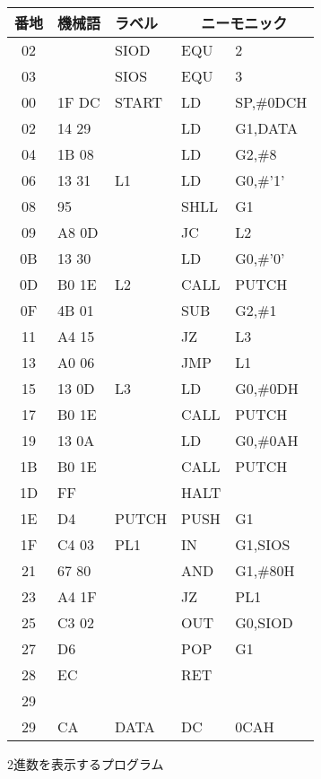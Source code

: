 \begin{figure}
{\small\tt\begin{center}
\begin{tabular}{|c|l|l|l l |} \hline
番地 & 機械語 & ラベル & \multicolumn{2}{|c|}{ニーモニック} \\
\hline
02 &       & SIOD   & EQU    & 2                 \\
03 &       & SIOS   & EQU    & 3                 \\
00 & 1F DC & START  & LD     & SP,\#0DCH         \\
02 & 14 29 &        & LD     & G1,DATA           \\
04 & 1B 08 &        & LD     & G2,\#8            \\
06 & 13 31 & L1     & LD     & G0,\#'1'          \\
08 & 95    &        & SHLL   & G1                \\
09 & A8 0D &        & JC     & L2                \\
0B & 13 30 &        & LD     & G0,\#'0'          \\
0D & B0 1E & L2     & CALL   & PUTCH             \\
0F & 4B 01 &        & SUB    & G2,\#1            \\
11 & A4 15 &        & JZ     & L3                \\
13 & A0 06 &        & JMP    & L1                \\
15 & 13 0D & L3     & LD     & G0,\#0DH          \\
17 & B0 1E &        & CALL   & PUTCH             \\
19 & 13 0A &        & LD     & G0,\#0AH          \\
1B & B0 1E &        & CALL   & PUTCH             \\
1D & FF    &        & HALT   &                   \\
1E & D4    & PUTCH  & PUSH   & G1                \\
1F & C4 03 & PL1    & IN     & G1,SIOS           \\
21 & 67 80 &        & AND    & G1,\#80H          \\
23 & A4 1F &        & JZ     & PL1               \\
25 & C3 02 &        & OUT    & G0,SIOD           \\
27 & D6    &        & POP    & G1                \\
28 & EC    &        & RET    &                   \\
29 &       &        &        &                   \\
29 & CA    & DATA   & DC     & 0CAH              \\
\hline
\end{tabular}
\end{center}}
\caption{2進数を表示するプログラム}
\label{fig:chap6:bin}
\end{figure}

